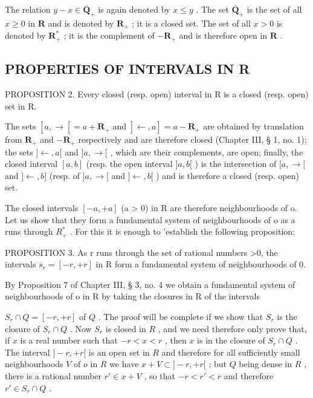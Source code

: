 The relation \(y - x \in \overline{\mathbf{Q}}_+\) is again denoted by \(x \leqslant y\) . The set \(\overline{\mathbf{Q}}_+\) is the set of all \(x \geqslant 0\) in \(\mathbf{R}\) and is denoted by \(\mathbf{R}_+\) ; it is a closed set. The set of all \(x > 0\) is denoted by \(\mathbf{R}_+^*\) ; it is the complement of \(-\mathbf{R}_+\) and is therefore open in \(\mathbf{R}\) .

\subsection{PROPERTIES OF INTERVALS IN R}

PROPOSITION 2. Every closed (resp. open) interval in R is a closed (resp. open) set in R.

The sets \([a, \rightarrow[ = a + \mathbf{R}_+ \text{ and } ]\leftarrow, a] = a - \mathbf{R}_+\) are obtained by translation from \(\mathbf{R}_+\) and \(-\mathbf{R}_+\) respectively and are therefore closed (Chapter III, § 1, no. 1); the sets \(]\leftarrow, a[\) and \(]a, \rightarrow[\) , which are their complements, are open; finally, the closed interval \([a, b]\) (resp. the open interval \(]a, b[\) ) is the intersection of \([a, \rightarrow[\) and \(]\leftarrow, b]\) (resp. of \(]a, \rightarrow[\) and \(]\leftarrow, b[\) ) and is therefore a closed (resp. open) set.

The closed intervals \([-a, +a]\) (a \textgreater{} 0) in R are therefore neighbourhoods of o. Let us show that they form a fundamental system of neighbourhoods of o as a runs through \(R_{+}^{*}\) . For this it is enough to 'establish the following proposition:

PROPOSITION 3. As r runs through the set of rational numbers \textgreater0, the intervals \(s_{r} = [-r, +r]\) in R form a fundamental system of neighbourhoods of 0.

By Proposition 7 of Chapter III, § 3, no. 4 we obtain a fundamental system of neighbourhoods of o in R by taking the closures in R of the intervals

\(S_{r} \cap Q = [-r, +r]\) of \(Q\) . The proof will be complete if we show that \(S_{r}\) is the closure of \(S_{r} \cap Q\) . Now \(S_{r}\) is closed in \(R\) , and we need therefore only prove that, if \(x\) is a real number such that \(-r < x < r\) , then \(x\) is in the closure of \(S_{r} \cap Q\) . The interval \(]-r, +r[\) is an open set in \(R\) and therefore for all sufficiently small neighbourhoods \(V\) of \(o\) in \(R\) we have \(x + V \subset ]-r, +r[\) ; but \(Q\) being dense in \(R\) , there is a rational number \(r' \in x + V\) , so that \(-r < r' < r\) and therefore \(r' \in S_{r} \cap Q\) .

